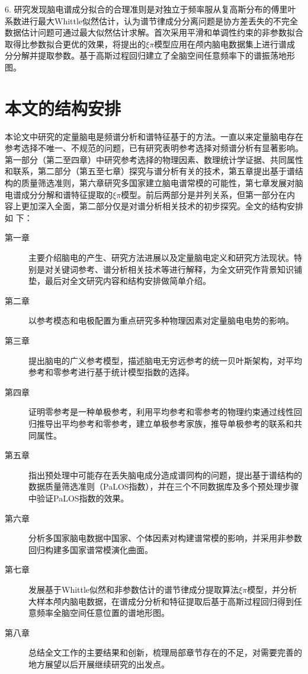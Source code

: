 6. 研究发现脑电谱成分拟合的合理准则是对独立于频率服从复高斯分布的傅里叶系数进行最大Whittle似然估计，认为谱节律成分分离问题是协方差丢失的不完全数据估计问题可通过最大似然估计求解。首次采用平滑和单调性约束的非参数拟合取得比参数拟合更优的效果，将提出的$\xi\pi$模型应用在颅内脑电数据集上进行谱成分分解并提取参数。基于高斯过程回归建立了全脑空间任意频率下的谱振荡地形图。

\section{本文的结构安排}
本论文中研究的定量脑电是频谱分析和谱特征基于的方法。一直以来定量脑电存在参考选择不唯一、不规范的问题，已有研究表明参考选择对频谱分析有显著影响。第一部分（第二至四章）中研究参考选择的物理因素、数理统计学证据、共同属性和联系，第二部分（第五至七章）探究与谱分析有关的技术，第五章提出基于谱结构的质量筛选准则，第六章研究多国家建立脑电谱常模的可能性，第七章发展对脑电谱成分分解和谱特征提取的$\xi\pi$模型。前后两部分是并列关系，但第一部分在内容上更加深入全面，第二部分仅是对谱分析相关技术的初步探究。全文的结构安排如
下：
\begin{description}
	\item[第一章] 主要介绍脑电的产生、研究方法进展以及定量脑电定义和研究方法现状。特别是对关键词参考、谱分析相关技术等进行解释，为全文研究作背景知识铺垫，最后对全文研究内容和结构安排做简单介绍。
	\item[第二章] 以参考模态和电极配置为重点研究多种物理因素对定量脑电电势的影响。
	\item[第三章] 提出脑电的广义参考模型，描述脑电无穷远参考的统一贝叶斯架构，对平均参考和零参考进行基于统计模型指数的选择。
	\item[第四章] 证明零参考是一种单极参考，利用平均参考和零参考的物理约束通过线性回归推导出平均参考和零参考，建立单极参考家族，推导单极参考的联系和共同属性。
	\item[第五章] 指出预处理中可能存在丢失脑电成分造成谱同构的问题，提出基于谱结构的数据质量筛选准则（PaLOS指数），并在三个不同数据库及多个预处理步骤中验证PaLOS指数的效果。
    \item[第六章] 分析多国家脑电数据中国家、个体因素对构建谱常模的影响，并采用非参数回归构建多国家谱常模演化曲面。
	\item[第七章] 发展基于Whittle似然和非参数估计的谱节律成分提取算法$\xi\pi$模型，并分析大样本颅内脑电数据，在谱成分分析和特征提取后基于高斯过程回归得到任意频率全脑空间任意位置的谱地形图。
	\item[第八章] 总结全文工作的主要结果和创新，梳理局部章节存在的不足，对需要完善的地方展望以后开展继续研究的出发点。
\end{description}